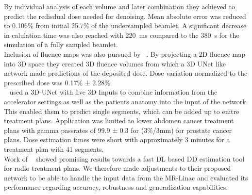 By individual analysis of each volume and later combination they achieved to predict the redisdual dose needed for denoising.
Mean absolute error was reduced to 0.106\% from initial 25.7\% of the undersampled beamlet.
A significant decrease in calulation time was also reached with 220~ms compared to the 380~s for the simulation of a fully sampled beamlet.\\
Inclusion of fluence maps was also pursued by \citeauthor{fan_data-driven_2020}~\cite{fan_data-driven_2020}. 
By projecting a 2D fluence map into 3D space they created 3D fluence volumes from which a 3D UNet like network made predictions of the deposited dose.
Dose variation normalized to the prescribed dose was 0.17\% ± 2.28\%.\\
\citeauthor{kontaxis_deepdose_2020}~\cite{kontaxis_deepdose_2020} used a 3D-UNet with five 3D Inputs to combine information from the accelerator settings as well as the patients anatomy into the input of the network.
This enabled them to predict single segments, which can be added up to enitre treatment plans.
Application was limited to lower abdomen cancer treatment plans with gamma passrates of 99.9 ± 0.3 for (3\%/3mm) for prostate cancer plans.
Dose estimation times were short with approximately 3 minutes for a treatment plan with 41 segments.\\

Work of \citeauthor{kontaxis_deepdose_2020}~\cite{kontaxis_deepdose_2020} showed promising results towards a fast \acs{DL} based \acs{DD} estimation tool for radio treatment plans.
We therefore made adjustments to their proposed network to be able to handle the input data from the MR-Linac and evaluated its performance regarding accuracy, robustness and generalization capabilities. 

